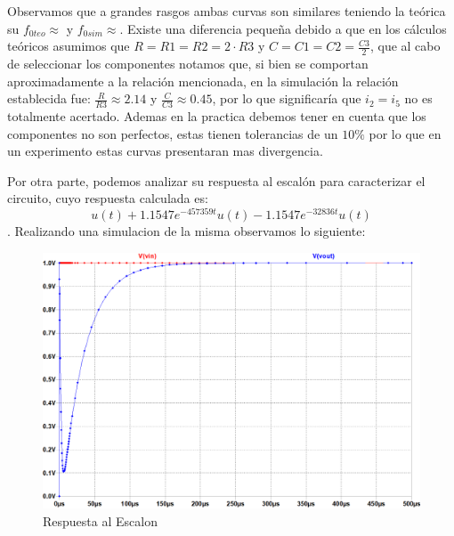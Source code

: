 
Observamos que a grandes rasgos ambas curvas son similares teniendo la teórica su $f_{0teo} \approx $ y $f_{0sim} \approx $. Existe una diferencia pequeña debido a que en los cálculos teóricos asumimos que $R = R1 = R2 = 2 \cdot R3$ y $C = C1 = C2 = \frac{C3}{2}$, que al cabo de seleccionar los componentes notamos que, si bien se comportan aproximadamente a la relación mencionada, en la simulación la relación establecida fue: $\frac{R}{R3} \approx 2.14$ y $\frac{C}{C3} \approx 0.45$, por lo que significaría que $i_2 = i_5$ no es totalmente acertado. Ademas en la practica debemos tener en cuenta que los componentes no son perfectos, estas tienen tolerancias de un $10\%$ por lo que en un experimento estas curvas presentaran mas divergencia. 

Por otra parte, podemos analizar su respuesta al escalón para caracterizar el circuito, cuyo respuesta calculada es: $$u(t) + 1.1547e^{-457359t}u(t) - 1.1547e^{-32836t}u(t)$$. Realizando una simulacion de la misma observamos lo siguiente:


\begin{figure}
	\centering
	\includegraphics[scale=0.4]{../EJ1/RElaqueva.png}
	\caption{Respuesta al Escalon}
	\label{ej1_3}
\end{figure}


